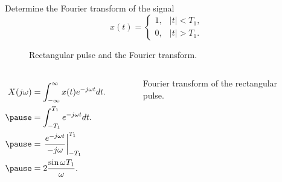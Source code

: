 \begin{frame}
    \begin{example}
        Determine the Fourier transform of the signal
        \begin{equation*}
            x(t) = \begin{cases}
                1,& |t| < T_1,\\
                0, & |t| > T_1.
            \end{cases}
        \end{equation*}
    \end{example}
    \pause
    {
        \begin{figure}
          \centering
          
          \caption{Rectangular pulse and the Fourier transform.}\label{fi:square_pulse}
        \end{figure}
    }
\end{frame}

\begin{frame}
    {
        \begin{columns}
                \begin{equation*}
                    \begin{aligned}
                        X(j\omega) &= \int_{-\infty}^{\infty}x(t)e^{-j\omega t} dt.\\ \pause
                        &= \int_{-T_1}^{T_1} e^{-j\omega t} dt.\\ \pause
                        &= \left.\frac{e^{-j\omega t}}{-j\omega}\right|_{-T_1}^{T_1} \\ \pause
                        &= 2\frac{\sin \omega T_1}{\omega}.\\
                    \end{aligned}
                \end{equation*}
                \pause
                \begin{figure}
                  \centering
                  
                  \caption{Fourier transform of the rectangular pulse.}\label{fi:square_pulse_ft}
                \end{figure}
        \end{columns}
    }

    
\end{frame}


